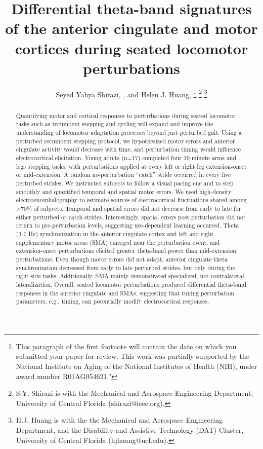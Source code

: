 \documentclass[shortpaper,twoside,web]{ieeecolor}
\begin{document}
\title{Differential theta-band signatures of the anterior cingulate and motor cortices during seated locomotor perturbations}
\author{Seyed Yahya Shirazi, , and Helen J. Huang, 
\thanks{This paragraph of the first footnote will contain the date on 
which you submitted your paper for review. This work was partially supported by the National Institute on Aging of the National Institutes of Health (NIH), under award number R01AG054621.'' }
\thanks{S.Y. Shirazi is with the Mechanical and Aerospace Engineering Department, University of Central Florida (shirazi@ieee.org). }
\thanks{H.J. Huang is with the the Mechanical and Aerospace Engineering Department, and the Disability and Assistive Technology (DAT) Cluster, University of Central Florida (hjhuang@ucf.edu).}
}

\maketitle

\begin{abstract}
Quantifying motor and cortical responses to perturbations during seated locomotor tasks such as recumbent stepping and cycling will expand and improve the understanding of locomotor adaptation processes beyond just perturbed gait. Using a perturbed recumbent stepping protocol, we hypothesized motor errors and anterior cingulate activity would decrease with time, and perturbation timing would influence electrocortical elicitation. Young adults (n=17) completed four 10-minute arms and legs stepping tasks, with perturbations applied at every left or right leg extension-onset or mid-extension. A random no-perturbation “catch” stride occurred in every five perturbed strides. We instructed subjects to follow a visual pacing cue and to step smoothly and quantified temporal and spatial motor errors. We used high-density electroencephalography to estimate sources of electrocortical fluctuations shared among >70\% of subjects. Temporal and spatial errors did not decrease from early to late for either perturbed or catch strides. Interestingly, spatial errors post-perturbation did not return to pre-perturbation levels, suggesting use-dependent learning occurred. Theta (3-7 Hz) synchronization in the anterior cingulate cortex and left and right supplementary motor areas (SMA) emerged near the perturbation event, and extension-onset perturbations elicited greater theta-band power than mid-extension perturbations. Even though motor errors did not adapt, anterior cingulate theta synchronization decreased from early to late perturbed strides, but only during the right-side tasks. Additionally, SMA mainly demonstrated specialized, not contralateral, lateralization. Overall, seated locomotor perturbations produced differential theta-band responses in the anterior cingulate and SMAs, suggesting that tuning perturbation parameters, e.g., timing, can potentially modify electrocortical responses. 
\end{abstract}
\end{document}
